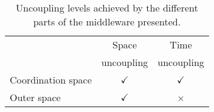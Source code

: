 
\begin{savenotes} %
  \begin{table}[htbp]
    \caption{Uncoupling levels achieved by the different parts of the middleware presented.}
    \begin{center}
      \begin{tabular}{lcc}
	~ & Space &	Time \\
	~ & uncoupling & uncoupling \\
	\hline
	Coordination space & $\checkmark$ & $\checkmark$ \\
	Outer space & $\checkmark$ & × \\
	\hline
      \end{tabular}
    \end{center}
    \label{tab:middleware_coordinationprop}
  \end{table}
\end{savenotes}